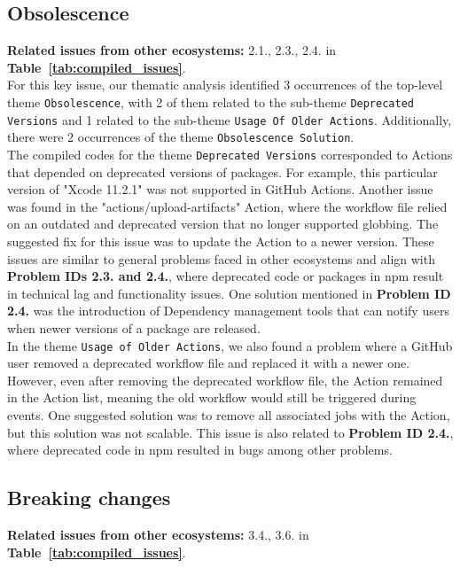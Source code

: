 \documentclass[conference]{IEEEtran}
\begin{document}
\subsection*{\textbf{Obsolescence}}
\textbf{Related issues from other ecosystems:} 2.1., 2.3., 2.4. in \textbf{Table~\ref{tab:compiled_issues}}.\\

	For this key issue, our thematic analysis identified 3 occurrences of the top-level theme \texttt{Obsolescence}, with 2 of them related to the sub-theme \texttt{Deprecated Versions} and 1 related to the sub-theme \texttt{Usage Of Older Actions}. Additionally, there were 2 occurrences of the theme \texttt{Obsolescence Solution}.\\
The compiled codes for the theme \texttt{Deprecated Versions} corresponded to Actions that depended on deprecated versions of packages. For example, this particular version of "Xcode 11.2.1" was not supported in GitHub Actions. Another issue was found in the "actions/upload-artifacts" Action, where the workflow file relied on an outdated and deprecated version that no longer supported globbing. The suggested fix for this issue was to update the Action to a newer version. These issues are similar to general problems faced in other ecosystems and align with \textbf{Problem IDs 2.3. and 2.4.}, where deprecated code or packages in npm result in technical lag and functionality issues. One solution mentioned in \textbf{Problem ID 2.4.} was the introduction of Dependency management tools that can notify users when newer versions of a package are released.\\
In the theme \texttt{Usage of Older Actions}, we also found a problem where a GitHub user removed a deprecated workflow file and replaced it with a newer one. However, even after removing the deprecated workflow file, the Action remained in the Action list, meaning the old workflow would still be triggered during events. One suggested solution was to remove all associated jobs with the Action, but this solution was not scalable. This issue is also related to \textbf{Problem ID 2.4.}, where deprecated code in npm resulted in bugs among other problems.
\subsection*{\textbf{Breaking changes}}
\textbf{Related issues from other ecosystems:} 3.4., 3.6. in \textbf{Table~\ref{tab:compiled_issues}}.\\
\end{document}
